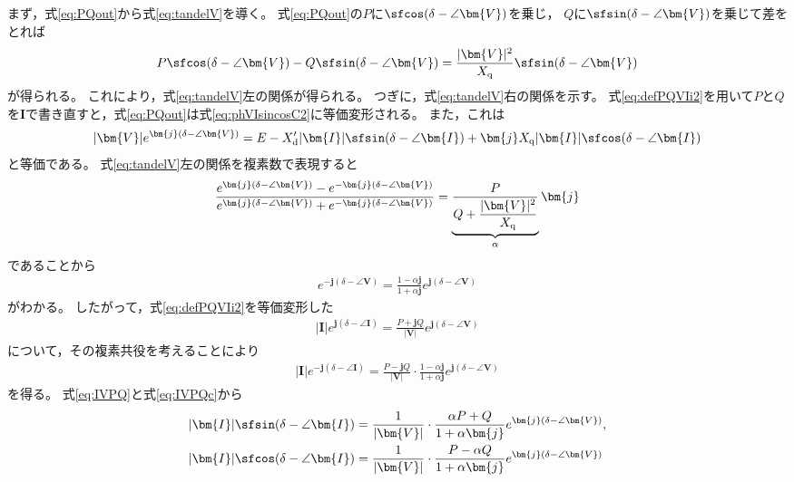\documentclass[tombow,dvipdfmx]{corona-a5}
\begin{document}
\begin{証明}
まず，式\ref{eq:PQout}から式\ref{eq:tandelV}を導く。
式\ref{eq:PQout}の$P$に$\sfcos (\delta - \angle \bm{V})$を乗じ，
$Q$に$\sfsin (\delta - \angle \bm{V})$を乗じて差をとれば
\begin{align*}
P \sfcos (\delta - \angle \bm{V}) - Q \sfsin (\delta - \angle \bm{V})
= \frac{|\bm{V}|^2}{X_{\rm q}} \sfsin (\delta - \angle \bm{V}) 
\end{align*}
が得られる。
これにより，式\ref{eq:tandelV}左の関係が得られる。
つぎに，式\ref{eq:tandelV}右の関係を示す。
式\ref{eq:defPQVIi2}を用いて$P$と$Q$を$\bm{I}$で書き直すと，式\ref{eq:PQout}は式\ref{eq:phVIsincosC2}に等価変形される。
また，これは
\begin{align}\label{eq:tmpVE}
|\bm{V}|e^{\bm{j}(\delta - \angle \bm{V})}=E
-X_{\rm d}' |\bm{I}| \sfsin (\delta - \angle \bm{I})
+ 
\bm{j} X_{\rm q} 
|\bm{I}| \sfcos (\delta - \angle \bm{I})
\end{align}
と等価である。
式\ref{eq:tandelV}左の関係を複素数で表現すると
\begin{align*}
\frac{ e^{\bm{j}(\delta - \angle \bm{V})} - e^{-\bm{j}(\delta - \angle \bm{V})}}
{e^{\bm{j}(\delta - \angle \bm{V})} + e^{-\bm{j}(\delta - \angle \bm{V})}}
= 
\underbrace{
\frac{P}{Q + \frac{ |\bm{V}|^2}{X_{\rm q}} }
}_{\alpha}
 \bm{j}
\end{align*}
であることから
\begin{align*}
e^{-\bm{j}(\delta - \angle \bm{V})} = \frac{1-\alpha \bm{j}}{1+\alpha \bm{j}}
e^{\bm{j}(\delta - \angle \bm{V})}
\end{align*}
がわかる。
したがって，式\ref{eq:defPQVIi2}を等価変形した
\begin{align}\label{eq:IVPQ}
|\bm{I}|e^{\bm{j}(\delta - \angle \bm{I})} = \frac{P+\bm{j}Q}{|\bm{V}|}  
e^{\bm{j}(\delta - \angle \bm{V})}
\end{align}
について，その複素共役を考えることにより
\begin{align}\label{eq:IVPQc}
|\bm{I}|e^{-\bm{j}(\delta - \angle \bm{I})} = \frac{P-\bm{j}Q}{|\bm{V}|}  
\cdot \frac{1-\alpha \bm{j}}{1+\alpha \bm{j}}
e^{\bm{j}(\delta - \angle \bm{V})}
\end{align}
を得る。
式\ref{eq:IVPQ}と式\ref{eq:IVPQc}から
\begin{align*}
|\bm{I}| \sfsin (\delta - \angle \bm{I})
& =
\frac{1}{|\bm{V}|} \cdot
\frac{\alpha P +Q}{ 1+\alpha \bm{j} }e^{\bm{j}(\delta - \angle \bm{V})}, \\
|\bm{I}| \sfcos (\delta - \angle \bm{I})
& =
\frac{1}{|\bm{V}|} \cdot
\frac{ P - \alpha Q}{ 1+\alpha \bm{j} }e^{\bm{j}(\delta - \angle \bm{V})}

\end{align*}
\end{証明}
\end{document}
